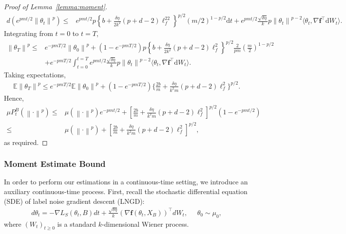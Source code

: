 \documentclass{article}
\newcommand{\norm}[1]{\left\lVert#1\right\rVert} %
\begin{document}
\begin{proof}[Proof of Lemma~\ref{lemma:moment}]
	\begin{align*}
		d(e^{pmt/2} \norm{\theta_t}^p) \leq&e^{pmt/2} p \left\{b +\frac{\delta \eta}{2 k^2} (p+d-2) \ell_f^22 \right\}^{p/2}   (m/2)^{1-p/2} \mathrm{d}t + e^{pmt/2} \frac{\sqrt{\delta \eta}}{k} p\norm{\theta_t}^{p-2} \langle \theta_t, \nabla \textbf{f}^\top \mathrm{d}W_t \rangle.
	\end{align*}
	Integrating from $t=0$ to $t=T$,
	\begin{align*}
		\norm{\theta_T}^p \leq & e^{-pmT/2} \norm{\theta_0}^p + (1 - e^{-pmT/2} ) p \left\{b +\frac{\delta \eta}{2 k^2} (p+d-2)    \ell_f^2 \right\}^{p/2}   \frac{2}{pm}  (\frac{m}{2})^{1-p/2}  \\
		&+ e^{-pmT/2} \int_{t=0}^{t=T} e^{pmt/2} \frac{\sqrt{\delta \eta}}{k} p\norm{\theta_t}^{p-2} \langle \theta_t, \nabla \textbf{f}^\top \mathrm{d}W_t \rangle.
	\end{align*}
	Taking expectations,
	\begin{align*}
		\mathbb{E} \norm{\theta_T}^p \leq
		e^{-pmT/2} \mathbb{E}\norm{\theta_0}^p + (1 - e^{-pmT/2} )  \{\frac{2b}{m} +\frac{\delta \eta}{k^2 m} (p+d-2)   \ell_f^2 \}^{p/2}.
	\end{align*}
	Hence,
	\begin{align*}
		\mu P_t^B (\norm{\cdot}^p) \leq& \mu (\norm{\cdot}^p) e^{-pmt/2} + \left[\frac{2b}{m} +\frac{\delta \eta}{k^2 m} (p+d-2)    \ell_f^2\right]^{p/2} ( 1- e^{-pmt/2})\\
		\leq &  \mu (\norm{\cdot}^p) + \left[\frac{2b}{m} +\frac{\delta \eta}{k^2 m} (p+d-2)   \ell_f^2\right]^{p/2},
	\end{align*}
	as required.
\end{proof}

\subsubsection{Moment Estimate Bound}
In order to perform our estimations in a continuous-time setting, we introduce an auxiliary continuous-time process. First, recall the stochastic differential equation (SDE) of label noise gradient descent (LNGD):
\begin{align}\label{sde}
	d\theta_t = - \nabla L_S(\theta_t, B) dt + \frac{\sqrt{\delta \eta}}{k} \left( \nabla \textbf{f}(\theta_t, X_B)\right)^\top dW_t, \;\;\;\;\; \theta_0 \sim \mu_0,
\end{align}
where $(W_t)_{t\geq0}$ is a standard $k$-dimensional Wiener process.
\end{document}
